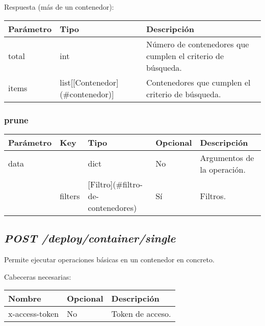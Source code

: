 			Respuesta (más de un contenedor):
			\begin{table}[!h]
				\centering
	\begin{adjustbox}{max width=\textwidth}
				\begin{tabular}{|l|l|l|}
					\hline
					Parámetro & Tipo & Descripción \\ \hline
					total & int & Número de contenedores que cumplen el criterio de búsqueda. \\ \hline
					items & list[[Contenedor](\#contenedor)] & Contenedores que cumplen el criterio de búsqueda. \\ \hline
				\end{tabular}
\end{adjustbox}
			\end{table}
		
		\subsubsection{prune}
			\begin{table}[!h]
				\centering
	\begin{adjustbox}{max width=\textwidth}
				\begin{tabular}{|l|l|l|l|l|}
					\hline
					Parámetro & Key & Tipo & Opcional & Descripción \\ \hline
					data &  & dict & No & Argumentos de la operación. \\ \hline
					& filters & [Filtro](\#filtro-de-contenedores) & Sí & Filtros. \\ \hline
				\end{tabular}
\end{adjustbox}
			\end{table}
	
	
	

	\subsection{\textit{POST /deploy/container/single}}
		Permite ejecutar operaciones básicas en un contenedor en concreto.
	
		Cabeceras necesarias:
		\begin{table}[h!]
			\centering
	\begin{adjustbox}{max width=\textwidth}
			\begin{tabular}{|l|l|l|}
				\hline
				Nombre & Opcional & Descripción \\ \hline
				x-access-token & No & Token de acceso. \\ \hline
			\end{tabular}
\end{adjustbox}
		\end{table}
		
